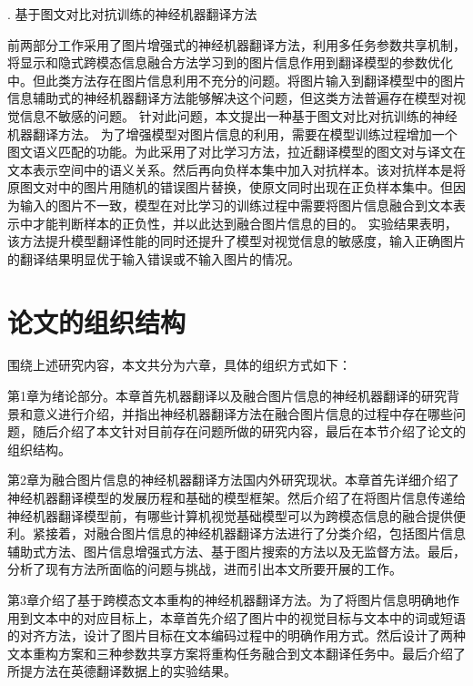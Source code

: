 {. 基于图文对比对抗训练的神经机器翻译方法}

前两部分工作采用了图片增强式的神经机器翻译方法，利用多任务参数共享机制，将显示和隐式跨模态信息融合方法学习到的图片信息作用到翻译模型的参数优化中。但此类方法存在图片信息利用不充分的问题。将图片输入到翻译模型中的图片信息辅助式的神经机器翻译方法能够解决这个问题，但这类方法普遍存在模型对视觉信息不敏感的问题。
针对此问题，本文提出一种基于图文对比对抗训练的神经机器翻译方法。
为了增强模型对图片信息的利用，需要在模型训练过程增加一个图文语义匹配的功能。为此采用了对比学习方法，拉近翻译模型的图文对与译文在文本表示空间中的语义关系。然后再向负样本集中加入对抗样本。该对抗样本是将原图文对中的图片用随机的错误图片替换，使原文同时出现在正负样本集中。但因为输入的图片不一致，模型在对比学习的训练过程中需要将图片信息融合到文本表示中才能判断样本的正负性，并以此达到融合图片信息的目的。
实验结果表明，该方法提升模型翻译性能的同时还提升了模型对视觉信息的敏感度，输入正确图片的翻译结果明显优于输入错误或不输入图片的情况。


\section{论文的组织结构}

围绕上述研究内容，本文共分为六章，具体的组织方式如下：

第1章为绪论部分。本章首先机器翻译以及融合图片信息的神经机器翻译的研究背景和意义进行介绍，并指出神经机器翻译方法在融合图片信息的过程中存在哪些问题，随后介绍了本文针对目前存在问题所做的研究内容，最后在本节介绍了论文的组织结构。

第2章为融合图片信息的神经机器翻译方法国内外研究现状。本章首先详细介绍了神经机器翻译模型的发展历程和基础的模型框架。然后介绍了在将图片信息传递给神经机器翻译模型前，有哪些计算机视觉基础模型可以为跨模态信息的融合提供便利。紧接着，对融合图片信息的神经机器翻译方法进行了分类介绍，包括图片信息辅助式方法、图片信息增强式方法、基于图片搜索的方法以及无监督方法。最后，分析了现有方法所面临的问题与挑战，进而引出本文所要开展的工作。

第3章介绍了基于跨模态文本重构的神经机器翻译方法。为了将图片信息明确地作用到文本中的对应目标上，本章首先介绍了图片中的视觉目标与文本中的词或短语的对齐方法，设计了图片目标在文本编码过程中的明确作用方式。然后设计了两种文本重构方案和三种参数共享方案将重构任务融合到文本翻译任务中。最后介绍了所提方法在英德翻译数据上的实验结果。

